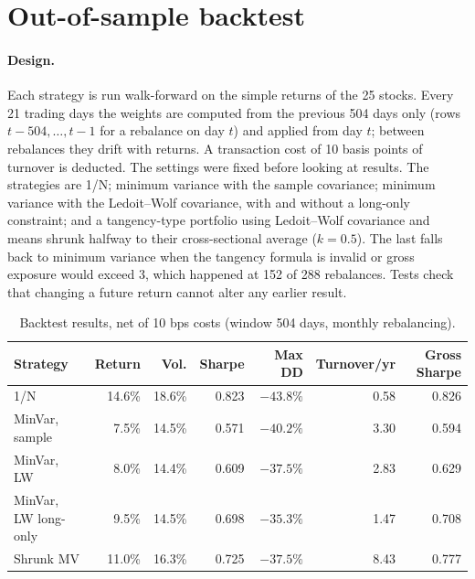 \documentclass[11pt,a4paper]{article}
\begin{document}
\section{Out-of-sample backtest}
\paragraph{Design.}
Each strategy is run walk-forward on the simple returns of the 25 stocks. Every 21 trading days the
weights are computed from the previous 504 days only (rows $t-504,\dots,t-1$ for a rebalance on day $t$)
and applied from day $t$; between rebalances they drift with returns. A transaction cost of 10 basis
points of turnover is deducted. The settings were fixed before looking at results. The strategies are 1/N;
minimum variance with the sample covariance; minimum variance with the Ledoit--Wolf covariance, with and
without a long-only constraint; and a tangency-type portfolio using Ledoit--Wolf covariance and means
shrunk halfway to their cross-sectional average ($k = 0.5$). The last falls back to minimum variance when
the tangency formula is invalid or gross exposure would exceed 3, which happened at 152 of 288
rebalances. Tests check that changing a future return cannot alter any earlier result.

\begin{table}[ht]
\centering
\caption{Backtest results, net of 10 bps costs (window 504 days, monthly rebalancing).}
\label{tab:main}
\small
\begin{tabular}{lrrrrrr}
\toprule
Strategy & Return & Vol. & Sharpe & Max DD & Turnover/yr & Gross Sharpe \\
\midrule
1/N                 & 14.6\% & 18.6\% & 0.823 & $-43.8\%$ & 0.58 & 0.826 \\
MinVar, sample      &  7.5\% & 14.5\% & 0.571 & $-40.2\%$ & 3.30 & 0.594 \\
MinVar, LW          &  8.0\% & 14.4\% & 0.609 & $-37.5\%$ & 2.83 & 0.629 \\
MinVar, LW long-only&  9.5\% & 14.5\% & 0.698 & $-35.3\%$ & 1.47 & 0.708 \\
Shrunk MV           & 11.0\% & 16.3\% & 0.725 & $-37.5\%$ & 8.43 & 0.777 \\
\bottomrule
\end{tabular}
\end{table}
\end{document}
